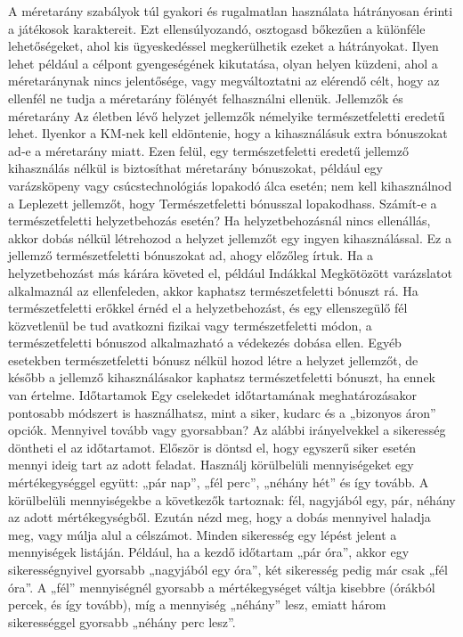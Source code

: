 \documentclass[oneside]{book}
\begin{document}
A méretarány szabályok túl gyakori és rugalmatlan használata hátrányosan érinti a játékosok karaktereit. Ezt ellensúlyozandó, osztogasd bőkezűen a különféle lehetőségeket, ahol kis ügyeskedéssel megkerülhetik ezeket a hátrányokat. Ilyen lehet például a célpont gyengeségének kikutatása, olyan helyen küzdeni, ahol a méretaránynak nincs jelentősége, vagy megváltoztatni az elérendő célt, hogy az ellenfél ne tudja a méretarány fölényét felhasználni ellenük.
Jellemzők és méretarány
Az életben lévő helyzet jellemzők némelyike természetfeletti eredetű lehet. Ilyenkor a KM‑nek kell eldöntenie, hogy a kihasználásuk extra bónuszokat ad‑e a méretarány miatt. Ezen felül, egy természetfeletti eredetű jellemző kihasználás nélkül is biztosíthat méretarány bónuszokat, például egy varázsköpeny vagy csúcstechnológiás lopakodó álca esetén; nem kell kihasználnod a Leplezett jellemzőt, hogy Természetfeletti bónusszal lopakodhass.
Számít‑e a természetfeletti helyzetbehozás esetén?
Ha helyzetbehozásnál nincs ellenállás, akkor dobás nélkül létrehozod a helyzet jellemzőt egy ingyen kihasználással. Ez a jellemző természetfeletti bónuszokat ad, ahogy előzőleg írtuk.
Ha a helyzetbehozást más kárára követed el, például Indákkal Megkötözött varázslatot alkalmaznál az ellenfeleden, akkor kaphatsz természetfeletti bónuszt rá.
Ha természetfeletti erőkkel érnéd el a helyzetbehozást, és egy ellenszegülő fél közvetlenül be tud avatkozni fizikai vagy természetfeletti módon, a természetfeletti bónuszod alkalmazható a védekezés dobása ellen.
Egyéb esetekben természetfeletti bónusz nélkül hozod létre a helyzet jellemzőt, de később a jellemző kihasználásakor kaphatsz természetfeletti bónuszt, ha ennek van értelme.
Időtartamok
Egy cselekedet időtartamának meghatározásakor pontosabb módszert is használhatsz, mint a siker, kudarc és a „bizonyos áron” opciók. Mennyivel tovább vagy gyorsabban? Az alábbi irányelvekkel a sikeresség döntheti el az időtartamot.
Először is döntsd el, hogy egyszerű siker esetén mennyi ideig tart az adott feladat. Használj körülbelüli mennyiségeket egy mértékegységgel együtt: „pár nap”, „fél perc”, „néhány hét” és így tovább. A körülbelüli mennyiségekbe a következők tartoznak: fél, nagyjából egy, pár, néhány az adott mértékegységből.
Ezután nézd meg, hogy a dobás mennyivel haladja meg, vagy múlja alul a célszámot. Minden sikeresség egy lépést jelent a mennyiségek listáján.
Például, ha a kezdő időtartam „pár óra”, akkor egy sikerességnyivel gyorsabb „nagyjából egy óra”, két sikeresség pedig már csak „fél óra”. A „fél” mennyiségnél gyorsabb a mértékegységet váltja kisebbre (órákból percek, és így tovább), míg a mennyiség „néhány” lesz, emiatt három sikerességgel gyorsabb „néhány perc lesz”.
\end{document}
